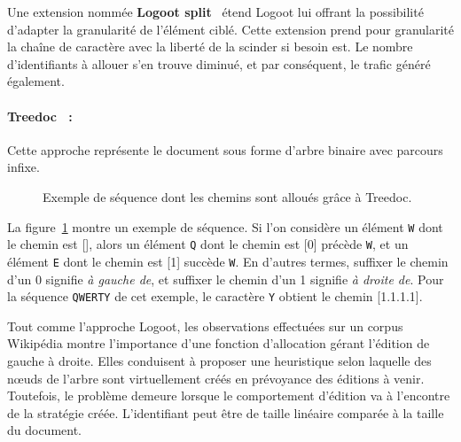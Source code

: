 \noindent Une extension nommée \textbf{Logoot split}~\cite{andre2013supporting}
étend Logoot lui offrant la possibilité d'adapter la granularité de l'élément
ciblé.  Cette extension prend pour granularité la chaîne de caractère avec la
liberté de la scinder si besoin est. Le nombre d'identifiants à allouer s'en
trouve diminué, et par conséquent, le trafic généré également.

\paragraph{Treedoc~\cite{letia2009crdts, preguica2009commutative} :} Cette
approche représente le document sous forme d'arbre binaire avec parcours infixe.
  
\begin{figure}
  \begin{center}
    
    \caption[Chemins alloués par Treedoc]
    {\label{repl:fig:treedocexample}Exemple de séquence dont les chemins sont
      alloués grâce à Treedoc.}
  \end{center}
\end{figure}

\noindent La figure~\ref{repl:fig:treedocexample} montre un exemple de
séquence. Si l'on considère un élément \texttt{W} dont le chemin est [], alors
un élément \texttt{Q} dont le chemin est [0] précède \texttt{W}, et un élément
\texttt{E} dont le chemin est [1] succède \texttt{W}. En d'autres termes,
suffixer le chemin d'un 0 signifie \emph{à gauche de}, et suffixer le chemin
d'un 1 signifie \emph{à droite de}. Pour la séquence \texttt{QWERTY} de cet
exemple, le caractère \texttt{Y} obtient le chemin [1.1.1.1].
  
\noindent Tout comme l'approche Logoot, les observations effectuées sur un
corpus Wikipédia montre l'importance d'une fonction d'allocation gérant
l'édition de gauche à droite. Elles conduisent à proposer une heuristique selon
laquelle des nœuds de l'arbre sont virtuellement créés en prévoyance des
éditions à venir. Toutefois, le problème demeure lorsque le comportement
d'édition va à l'encontre de la stratégie créée. L'identifiant peut être de
taille linéaire comparée à la taille du document.


